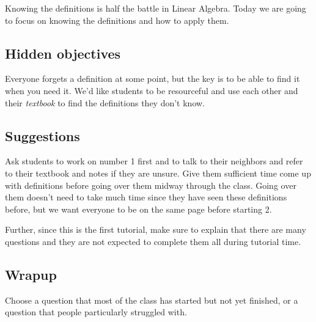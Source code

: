 \documentclass[11pt]{exam}
\begin{document}
	Knowing the definitions is half the battle in Linear Algebra.  Today
	we are going to focus on knowing the definitions and how to apply them.

\subsection*{Hidden objectives}
	
	Everyone forgets a definition at some point, but the key is to be able to
	find it when you need it.  We'd like students to be resourceful and use
	each other and their \emph{textbook} to find the definitions they don't know.

\subsection*{Suggestions}
	Ask students to work on number 1 first and to talk to their neighbors 
	and refer to their textbook and notes if they are unsure.  Give them
	sufficient time come up with definitions before going over them 
	midway through the class.  Going over them doesn't need to take much time
	since they have seen these definitions before, but we want everyone to be
	on the same page before starting 2.

	Further, since this is the first tutorial, make sure to explain that there
	are many questions and they are not expected to complete them all during
	tutorial time.

\subsection*{Wrapup}
	Choose a question that most of the class has started but not yet finished,
	or a question that people particularly struggled with.
\end{document}
